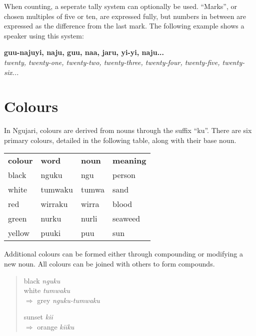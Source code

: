 When counting, a seperate tally system can optionally be used. ``Marks'', or
chosen multiples of five or ten, are expressed fully, but numbers in between are
expressed as the difference from the last mark. The following example shows a
speaker using this system:

\begin{sentence}
\textbf{guu-najuyi, naju, guu, naa, jaru, yi-yi, naju...}\\
\textit{twenty, twenty-one, twenty-two, twenty-three, twenty-four, twenty-five, twenty-six...}
\end{sentence}

\section{Colours}

In Ngujari, colours are derived from nouns through the suffix ``ku''. There are
six primary colours, detailed in the following table, along with their base noun.

\begin{table}[h]
\centering
\begin{tabular}{llll}
\textbf{colour} & \textbf{word} & \textbf{noun} & \textbf{meaning}\\
black & nguku & ngu & person\\
white & tumwaku & tumwa & sand\\
red & wirraku & wirra & blood\\
green & nurku & nurli & seaweed\\
yellow & puuki & puu & sun\\
\end{tabular}
\end{table}

Additional colours can be formed either through compounding or modifying a new
noun. All colours can be joined with others to form compounds.

\begin{quote}
\begin{multicols}{2}
black \textit{nguku}\\
white \textit{tumwaku}\\
$\Rightarrow$ grey \textit{nguku-tumwaku}

sunset \textit{kii}\\
$\Rightarrow$ orange \textit{kiiku}
\end{multicols}
\end{quote}
